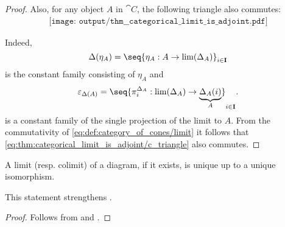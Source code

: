 \begin{proof}
  Also, for any object \( A \) in \( \cat{C} \), the following triangle also commutes:
  \begin{equation}\label{eq:thm:categorical_limit_is_adjoint/c_triangle}
    \begin{aligned}
      \texttt{[image: output/thm\_\_categorical\_limit\_is\_adjoint.pdf]}
    \end{aligned}
  \end{equation}

  Indeed,
  \begin{equation*}
    \Delta(\eta_A) = \seq{ \eta_A: A \to \lim(\Delta_A) }_{i \in \cat{I}}
  \end{equation*}
  is the constant family consisting of \( \eta_A \) and
  \begin{equation*}
    \varepsilon_{\Delta(A)} = \seq{ \pi_i^{\Delta_A}: \lim(\Delta_A) \to \underbrace{\Delta_A(i)}_{A} }_{i \in \cat{I}}.
  \end{equation*}
  is a constant family of the single projection of the limit to \( A \). From the commutativity of \eqref{eq:def:category_of_cones/limit} it follows that \eqref{eq:thm:categorical_limit_is_adjoint/c_triangle} also commutes.
\end{proof}

\begin{corollary}\label{thm:categorical_limit_uniqueness}
  A limit (resp. colimit) of a diagram, if it exists, is unique up to a unique isomorphism.

  This statement strengthens .
\end{corollary}
\begin{proof}
  Follows from  and .
\end{proof}

